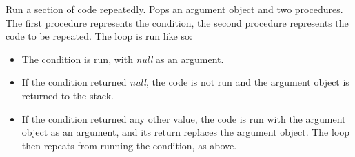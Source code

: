 Run a section of code repeatedly. Pops an argument object and two procedures. The first procedure represents the condition, the second procedure represents the code to be repeated. The loop is run like so:

\begin{itemize}
\item The condition is run, with \textit{null} as an argument.
\item If the condition returned \textit{null}, the code is not run and the argument object is returned to the stack.
\item If the condition returned any other value, the code is run with the argument object as an argument, and its return replaces the argument object. The loop then repeats from running the condition, as above.
\end{itemize}
